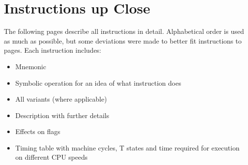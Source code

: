 \documentclass[12pt,twoside,openright,a4paper]{book}
\begin{document}
\chapter{Instructions up Close}
\label{instruction_details}


\newcommand{\DetailParityOverflow}[1]{
	\IfEqCase{#1}
	{
		{p}{
			\small
			\setlength{\unitlength}{0.2mm}
			\begin{picture}(20,10)
				\put(-5.6,7){\circle{20}}
				\put(-11,0){P}
				\put(4,0){V}
			\end{picture}
		}
		{v}{
			\small
			\setlength{\unitlength}{0.2mm}
			\begin{picture}(20,10)
				\put(11,7){\circle{20}}
				\put(-11,0){P}
				\put(4,0){V}
			\end{picture}
		}
		{}{PV}
	}
}
The following pages describe all instructions in detail. Alphabetical order is used as much as possible, but some deviations were made to better fit instructions to pages. Each instruction includes:

\begin{itemize}
	\setlength\itemsep{1pt}
	\item Mnemonic
	\item Symbolic operation for an idea of what instruction does
	\item All variants (where applicable)
	\item Description with further details
	\item Effects on flags
	\item Timing table with machine cycles, T states and time required for execution on different CPU speeds
\end{itemize}
\end{document}
